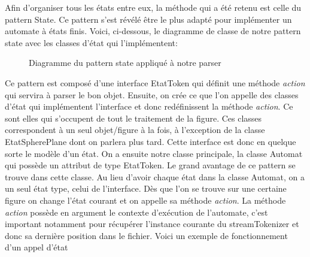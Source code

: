 \documentclass[../../Rapport RayTracer]{subfiles}
\begin{document}
Afin d'organiser tous les états entre eux, la méthode qui a été retenu est celle du pattern State. Ce pattern s'est révélé être le plus adapté pour implémenter un automate à états finis. Voici, ci-dessous, le diagramme de classe de notre pattern state avec les classes d'état qui l'implémentent:

\begin{figure}[h!]
	
	\caption{Diagramme du pattern state appliqué à notre parser}
	\label{diagrammePatternState}
\end{figure}
\FloatBarrier

Ce pattern est composé d'une interface EtatToken qui définit une méthode \textit{action} qui servira à parser le bon objet. Ensuite, on crée ce que l'on appelle des classes d'état qui implémentent l'interface et donc redéfinissent la méthode \textit{action}. Ce sont elles qui s'occupent de tout le traitement de la figure. Ces classes correspondent à un seul objet/figure à la fois, à l'exception de la classe EtatSpherePlane dont on parlera plus tard. Cette interface est donc en quelque sorte le modèle d'un état.
On a ensuite notre classe principale, la classe Automat qui possède un attribut de type EtatToken. Le grand avantage de ce pattern se trouve dans cette classe. Au lieu d'avoir chaque état dans la classe Automat, on a un seul état type, celui de l'interface. Dès que l'on se trouve sur une certaine figure on change l'état courant et on appelle sa méthode \textit{action}. La méthode \textit{action} possède en argument le contexte d'exécution de l'automate, c'est important notamment pour récupérer l'instance courante du streamTokenizer et donc sa dernière position dans le fichier. Voici un exemple de fonctionnement d'un appel d'état
 
\end{document}
